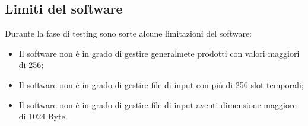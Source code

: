 \documentclass[a4paper]{report}
\begin{document}
    \subsection{Limiti del software}
    Durante la fase di testing sono sorte alcune limitazioni del software:

      \begin{itemize}
        \item Il software non è in grado di gestire generalmete prodotti con valori maggiori di 256;
        \item Il software non è in grado di gestire file di input con più di 256 slot temporali;
        \item Il software non è in grado di gestire file di input aventi dimensione maggiore di 1024 Byte.
      \end{itemize}
\end{document}
